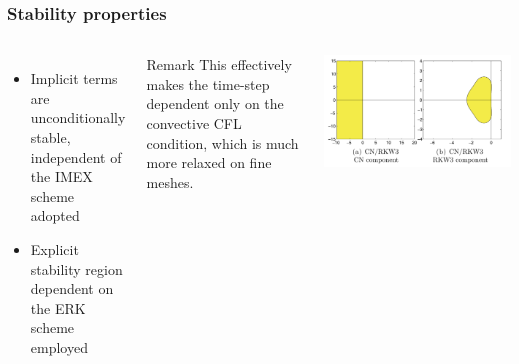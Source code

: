     \begin{frame}
    \frametitle{Stability properties}
    
    \begin{columns}
    
    
    \begin{itemize}
        \item Implicit terms are unconditionally stable, independent of the IMEX scheme adopted
        \item Explicit stability region dependent on the ERK scheme employed
    \end{itemize}
    
    \begin{block}{Remark}
        This effectively makes the time-step dependent only on the convective CFL condition, which is much more relaxed on fine meshes.
    \end{block}
    
    \includegraphics[width=1.1\textwidth]{images/imex_stab.png}
    
    \end{columns}
    
    \end{frame}
    
    
